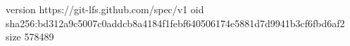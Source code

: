 version https://git-lfs.github.com/spec/v1
oid sha256:bd312a9c5007c0addcb8a4184f1febf640506174e5881d7d9941b3cf6fbd6af2
size 578489
